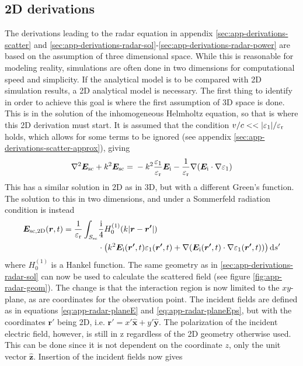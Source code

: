 \documentclass[11pt,twoside]{eitExjobb}
\begin{document}
	\subsection{2D derivations} \label{sec:app-derivations-radar-2d}
	The derivations leading to the radar equation in appendix \ref{sec:app-derivations-scatter} and \ref{sec:app-derivations-radar-sol}-\ref{sec:app-derivations-radar-power} are based on the assumption of three dimensional space. While this is reasonable for modeling reality, simulations are often done in two dimensions for computational speed and simplicity. If the analytical model is to be compared with 2D simulation results, a 2D analytical model is necessary. The first thing to identify in order to achieve this goal is where the first assumption of 3D space is done. This is in the solution of the inhomogeneous Helmholtz equation, so that is where this 2D derivation must start. It is assumed that the condition $v/c << |\varepsilon_1|/\varepsilon_{\mathrm{r}}$ holds, which allows for some terms to be ignored (see appendix \ref{sec:app-derivations-scatter-approx}), giving
	\begin{equation*}
		\nabla^2\bm{E}_{\mathrm{sc}} + k^2 \bm{E}_{\mathrm{sc}} = \\
		-k^2 \frac{\varepsilon_1}{\varepsilon_{\mathrm{r}}} \bm{E}_{\mathrm{i}} -\frac{1}{\varepsilon_{\mathrm{r}}}\nabla(\bm{E}_{\mathrm{i}} \cdot \nabla \varepsilon_1)
	\end{equation*}
	This has a similar solution in 2D as in 3D, but with a different Green's function. The solution to this in two dimensions, and under a Sommerfeld radiation condition \addref is instead
	\begin{equation*}
	\begin{split}
		\bm{E}_{\mathrm{sc,2D}}(\bm{r},t) = \frac{1}{\varepsilon_{\mathrm{r}}} \int_{S_{\mathrm{sc}}} & \frac{\mathrm{i}}{4} H_0^{(1)}( k |\bm{r}-\bm{r'}|) \\
		&\cdot \left( k^2 \bm{E}_{\mathrm{i}} (\bm{r'},t) \varepsilon_1 (\bm{r'},t) + \nabla (\bm{E}_{\mathrm{i}} (\bm{r'},t) \cdot \nabla \varepsilon_1 (\bm{r'},t)) \right) \mathrm{d}s'
	\end{split}
	\end{equation*}
	where $H_0^{(1)}$ is a Hankel function. The same geometry as in \ref{sec:app-derivations-radar-sol} can now be used to calculate the scattered field (see figure \ref{fig:app-radar-geom}). The change is that the interaction region is now limited to the $xy$-plane, as are coordinates for the observation point. The incident fields are defined as in equations \eqref{eq:app-radar-planeE} and \eqref{eq:app-radar-planeEps}, but with the coordinates $\bm{r}'$ being 2D, i.e. $\bm{r}' = x'\bm{\hat{x}} + y'\bm{\hat{y}}$. The polarization of the incident electric field, however, is still in z regardless of the 2D geometry otherwise used. This can be done since it is not dependent on the coordinate $z$, only the unit vector $\bm{\hat{z}}$. Insertion of the incident fields now gives
\end{document}
